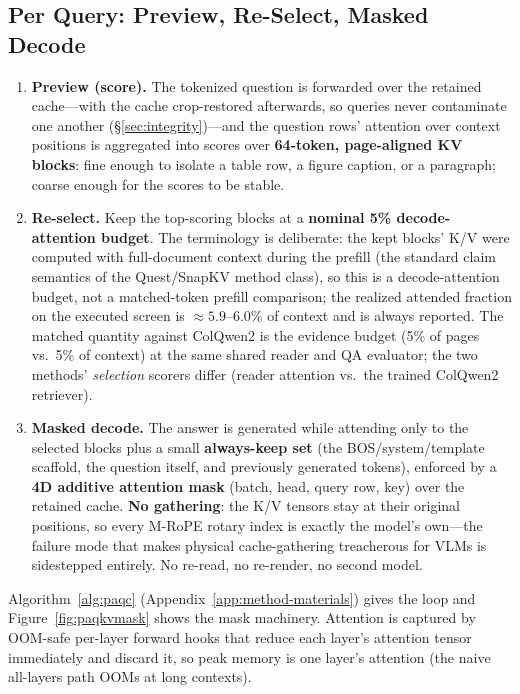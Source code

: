 \documentclass[letterpaper]{article} %
\begin{document}
\subsection{Per Query: Preview, Re-Select, Masked Decode}
\begin{enumerate}
\item \textbf{Preview (score).} The tokenized question is forwarded over the retained cache---with the cache crop-restored afterwards, so queries never contaminate one another (\S\ref{sec:integrity})---and the question rows' attention over context positions is aggregated into scores over \textbf{64-token, page-aligned KV blocks}: fine enough to isolate a table row, a figure caption, or a paragraph; coarse enough for the scores to be stable.
\item \textbf{Re-select.} Keep the top-scoring blocks at a \textbf{nominal 5\% decode-attention budget}. The terminology is deliberate: the kept blocks' K/V were computed with full-document context during the prefill (the standard claim semantics of the Quest/SnapKV method class), so this is a decode-attention budget, not a matched-token prefill comparison; the realized attended fraction on the executed screen is ${\approx}5.9$--$6.0\%$ of context and is always reported. The matched quantity against ColQwen2 is the evidence budget (5\% of pages vs.\ 5\% of context) at the same shared reader and QA evaluator; the two methods' \emph{selection} scorers differ (reader attention vs.\ the trained ColQwen2 retriever).
\item \textbf{Masked decode.} The answer is generated while attending only to the selected blocks plus a small \textbf{always-keep set} (the BOS/system/template scaffold, the question itself, and previously generated tokens), enforced by a \textbf{4D additive attention mask} (batch, head, query row, key) over the retained cache. \textbf{No gathering}: the K/V tensors stay at their original positions, so every M-RoPE rotary index is exactly the model's own---the failure mode that makes physical cache-gathering treacherous for VLMs is sidestepped entirely. No re-read, no re-render, no second model.
\end{enumerate}
Algorithm~\ref{alg:paqc} (Appendix~\ref{app:method-materials}) gives the loop and Figure~\ref{fig:paqkvmask} shows the mask machinery. Attention is captured by OOM-safe per-layer forward hooks that reduce each layer's attention tensor immediately and discard it, so peak memory is one layer's attention (the naive all-layers path OOMs at long contexts).
\end{document}
